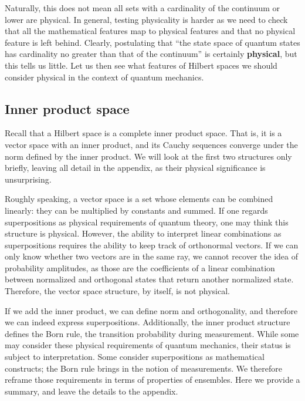 \documentclass[10pt,twocolumn, nofootinbib]{revtex4-2}
\begin{document}
Naturally, this does not mean all sets with a cardinality of the continuum or lower are physical. In general, testing physicality is harder as we need to check that all the mathematical features map to physical features and that no physical feature is left behind. Clearly, postulating that ``the state space of quantum states has cardinality no greater than that of the continuum'' is certainly \textbf{physical}, but this tells us little. Let us then see what features of Hilbert spaces we should consider physical in the context of quantum mechanics.

\subsection{Inner product space}

Recall that a Hilbert space is a complete inner product space. That is, it is a vector space with an inner product, and its Cauchy sequences converge under the norm defined by the inner product. We will look at the first two structures only briefly, leaving all detail in the appendix, as their physical significance is unsurprising.

Roughly speaking, a vector space is a set whose elements can be combined linearly: they can be multiplied by constants and summed. If one regards superpositions as physical requirements of quantum theory, one may think this structure is physical. However, the ability to interpret linear combinations as superpositions requires the ability to keep track of orthonormal vectors. If we can only know whether two vectors are in the same ray, we cannot recover the idea of probability amplitudes, as those are the coefficients of a linear combination between normalized and orthogonal states that return another normalized state. Therefore, the vector space structure, by itself, is not physical.

If we add the inner product, we can define norm and orthogonality, and therefore we can indeed express superpositions. Additionally, the inner product structure defines the Born rule, the transition probability during measurement. While some may consider these physical requirements of quantum mechanics, their status is subject to interpretation.\cite{albert_quantum_1994, wallace_everett_2013, howard_complementarity_2021, ghirardi_unified_1986} Some consider superpositions as mathematical constructs; the Born rule brings in the notion of measurements. We therefore reframe those requirements in terms of properties of ensembles. Here we provide a summary, and leave the details to the appendix.
\end{document}
